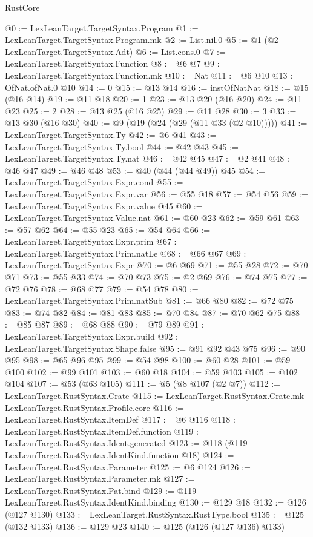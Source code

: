 \begin{lexlean}{RustCore}
\begin{coremodule}
@0 := LexLeanTarget.TargetSyntax.Program
@1 := LexLeanTarget.TargetSyntax.Program.mk
@2 := List.nil.{0}
@5 := @1 (@2 LexLeanTarget.TargetSyntax.Adt)
@6 := List.cons.{0}
@7 := LexLeanTarget.TargetSyntax.Function
@8 := @6 @7
@9 := LexLeanTarget.TargetSyntax.Function.mk
@10 := Nat
@11 := @6 @10
@13 := OfNat.ofNat.{0} @10
@14 := 0
@15 := @13 @14
@16 := instOfNatNat
@18 := @15 (@16 @14)
@19 := @11 @18
@20 := 1
@23 := @13 @20 (@16 @20)
@24 := @11 @23
@25 := 2
@28 := @13 @25 (@16 @25)
@29 := @11 @28
@30 := 3
@33 := @13 @30 (@16 @30)
@40 := @9 (@19 (@24 (@29 (@11 @33 (@2 @10)))))
@41 := LexLeanTarget.TargetSyntax.Ty
@42 := @6 @41
@43 := LexLeanTarget.TargetSyntax.Ty.bool
@44 := @42 @43
@45 := LexLeanTarget.TargetSyntax.Ty.nat
@46 := @42 @45
@47 := @2 @41
@48 := @46 @47
@49 := @46 @48
@53 := @40 (@44 (@44 @49)) @45
@54 := LexLeanTarget.TargetSyntax.Expr.cond
@55 := LexLeanTarget.TargetSyntax.Expr.var
@56 := @55 @18
@57 := @54 @56
@59 := LexLeanTarget.TargetSyntax.Expr.value @45
@60 := LexLeanTarget.TargetSyntax.Value.nat
@61 := @60 @23
@62 := @59 @61
@63 := @57 @62
@64 := @55 @23
@65 := @54 @64
@66 := LexLeanTarget.TargetSyntax.Expr.prim
@67 := LexLeanTarget.TargetSyntax.Prim.natLe
@68 := @66 @67
@69 := LexLeanTarget.TargetSyntax.Expr
@70 := @6 @69
@71 := @55 @28
@72 := @70 @71
@73 := @55 @33
@74 := @70 @73
@75 := @2 @69
@76 := @74 @75
@77 := @72 @76
@78 := @68 @77
@79 := @54 @78
@80 := LexLeanTarget.TargetSyntax.Prim.natSub
@81 := @66 @80
@82 := @72 @75
@83 := @74 @82
@84 := @81 @83
@85 := @70 @84
@87 := @70 @62 @75
@88 := @85 @87
@89 := @68 @88
@90 := @79 @89
@91 := LexLeanTarget.TargetSyntax.Expr.build
@92 := LexLeanTarget.TargetSyntax.Shape.false
@95 := @91 @92 @43 @75
@96 := @90 @95
@98 := @65 @96 @95
@99 := @54 @98
@100 := @60 @28
@101 := @59 @100
@102 := @99 @101
@103 := @60 @18
@104 := @59 @103
@105 := @102 @104
@107 := @53 (@63 @105)
@111 := @5 (@8 @107 (@2 @7))
@112 := LexLeanTarget.RustSyntax.Crate
@115 := LexLeanTarget.RustSyntax.Crate.mk LexLeanTarget.RustSyntax.Profile.core
@116 := LexLeanTarget.RustSyntax.ItemDef
@117 := @6 @116
@118 := LexLeanTarget.RustSyntax.ItemDef.function
@119 := LexLeanTarget.RustSyntax.Ident.generated
@123 := @118 (@119 LexLeanTarget.RustSyntax.IdentKind.function @18)
@124 := LexLeanTarget.RustSyntax.Parameter
@125 := @6 @124
@126 := LexLeanTarget.RustSyntax.Parameter.mk
@127 := LexLeanTarget.RustSyntax.Pat.bind
@129 := @119 LexLeanTarget.RustSyntax.IdentKind.binding
@130 := @129 @18
@132 := @126 (@127 @130)
@133 := LexLeanTarget.RustSyntax.RustType.bool
@135 := @125 (@132 @133)
@136 := @129 @23
@140 := @125 (@126 (@127 @136) @133)

\end{coremodule}
\end{lexlean}
